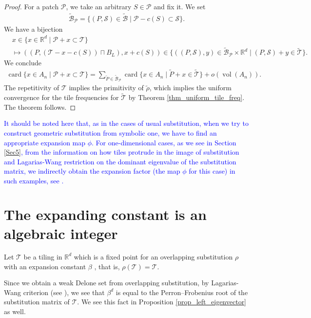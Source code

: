 \documentclass[a4]{amsart}
\DeclareMathOperator{\vol}{vol}
\DeclareMathOperator{\card}{card}
\newcommand{\R}{{\mathbb R}}
\newcommand{\T}{{\mathcal T}}
\theoremstyle{definition}
\begin{document}
\begin{proof}
    For a patch $\mathcal{P}$, we take an arbitrary $S\in\mathcal{P}$ and fix it. We set
    \begin{align*}
        \widetilde{\mathcal{B}}_{\mathcal{P}}
        =\{(P,\mathcal{S})\in\tilde{\mathcal{B}}\mid \mathcal{P}-c(S)\subset \mathcal{S}\}.
    \end{align*}
        We have a bijection
        \begin{align*}
            &x\in\{x\in\mathbb{R}^d\mid \mathcal{P}+x\subset\mathcal{T}\}\\
            &\mapsto ((P,(\mathcal{T}-x-c(S))\sqcap B_L), x+c(S))\in\{((P,\mathcal{S}),y)\in\widetilde{\mathcal{B}}_{\mathcal{P}}\times \mathbb{R}^d\mid (P,\mathcal{S})+y\in\tilde{\mathcal{T}}\}.
        \end{align*}
We conclude
\begin{align*}
    \card\{x\in A_n\mid \mathcal{P}+x\subset\mathcal{T}\}=\sum_{\tilde{P}\in\widetilde{\mathcal{B}}_{\mathcal{P}}}\card\{x\in A_n\mid \tilde{P}+x\in\tilde{\mathcal{T}}\}+o(\vol (A_n)).
\end{align*}
The repetitivity of $\mathcal{T}$ implies the primitivity of $\tilde{\rho}$, which implies the uniform convergence for the tile frequencies for $\tilde{\mathcal{T}}$ by
Theorem \ref{thm_uniform_tile_freq}.
The theorem follows.
\end{proof}

\textcolor{blue}{
It should be noted here that, as in the cases of usual substitution, when we try to construct geometric substitution from symbolic one, we have to find an appropriate expansion map $\phi$. 
For one-dimensional cases, as we see in Section \ref{Sec5}, from the information on how tiles protrude in the image of substitution and Lagarias-Wang restriction on the dominant eigenvalue of the substitution matrix, we indirectly 
obtain the expansion factor (the map $\phi$ for this case) in such examples,
see \cite{Lagarias-Wang:03}.}


\section{The expanding constant is an algebraic integer}\label{Sec3}

Let $\T$ be a tiling in $\R^d$ which is a fixed point for an overlapping substitution $\rho$ with an expansion constant $\beta$
, that is,
$\rho(\mathcal{T})=\mathcal{T}$.

Since we obtain a weak Delone set from overlapping substitution, 
by Lagarias-Wang criterion (see \cite{Lagarias-Wang:03}), 
we see that $\beta^d$ is equal to the Perron--Frobenius root of the substitution matrix of $\T$. We see this fact in Proposition \ref{prop_left_eigenvector} as well. 
\end{document}
